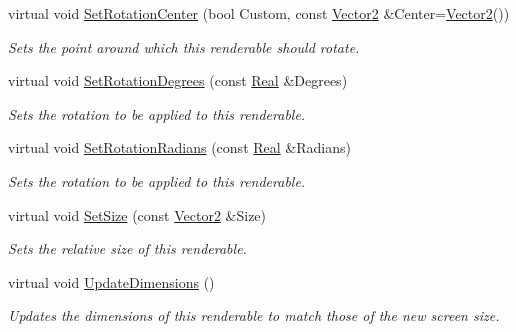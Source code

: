 \begin{DoxyCompactItemize}
virtual void \hyperlink{classMezzanine_1_1UI_1_1Rectangle_a3d04e80e480f70b1db601c8c364c699d}{SetRotationCenter} (bool Custom, const \hyperlink{classMezzanine_1_1Vector2}{Vector2} \&Center=\hyperlink{classMezzanine_1_1Vector2}{Vector2}())
\begin{DoxyCompactList}\small\item\em Sets the point around which this renderable should rotate. \item\end{DoxyCompactList}\item 
virtual void \hyperlink{classMezzanine_1_1UI_1_1Rectangle_a150b80178ff979c63a009464ba66b7e2}{SetRotationDegrees} (const \hyperlink{namespaceMezzanine_a726731b1a7df72bf3583e4a97282c6f6}{Real} \&Degrees)
\begin{DoxyCompactList}\small\item\em Sets the rotation to be applied to this renderable. \item\end{DoxyCompactList}\item 
virtual void \hyperlink{classMezzanine_1_1UI_1_1Rectangle_a03e8cb54ff9ff0c2a87e69895ac34080}{SetRotationRadians} (const \hyperlink{namespaceMezzanine_a726731b1a7df72bf3583e4a97282c6f6}{Real} \&Radians)
\begin{DoxyCompactList}\small\item\em Sets the rotation to be applied to this renderable. \item\end{DoxyCompactList}\item 
virtual void \hyperlink{classMezzanine_1_1UI_1_1Rectangle_a1f7a9a5686063b03a254c26a420f458c}{SetSize} (const \hyperlink{classMezzanine_1_1Vector2}{Vector2} \&Size)
\begin{DoxyCompactList}\small\item\em Sets the relative size of this renderable. \item\end{DoxyCompactList}\item 
virtual void \hyperlink{classMezzanine_1_1UI_1_1Rectangle_a86d759d43ec0c1d429c572a782405e8c}{UpdateDimensions} ()
\begin{DoxyCompactList}\small\item\em Updates the dimensions of this renderable to match those of the new screen size. \item\end{DoxyCompactList}\end{DoxyCompactItemize}
